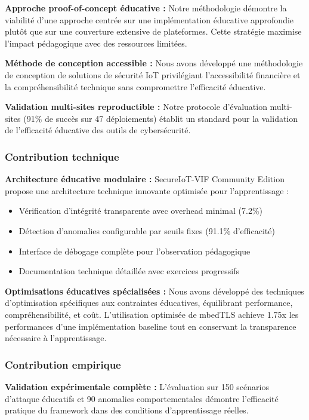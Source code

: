 \textbf{Approche proof-of-concept éducative :} Notre méthodologie démontre la viabilité d'une approche centrée sur une implémentation éducative approfondie plutôt que sur une couverture extensive de plateformes. Cette stratégie maximise l'impact pédagogique avec des ressources limitées.

\textbf{Méthode de conception accessible :} Nous avons développé une méthodologie de conception de solutions de sécurité IoT privilégiant l'accessibilité financière et la compréhensibilité technique sans compromettre l'efficacité éducative.

\textbf{Validation multi-sites reproductible :} Notre protocole d'évaluation multi-sites (91\% de succès sur 47 déploiements) établit un standard pour la validation de l'efficacité éducative des outils de cybersécurité.

\subsubsection{Contribution technique}

\textbf{Architecture éducative modulaire :} SecureIoT-VIF Community Edition propose une architecture technique innovante optimisée pour l'apprentissage :
\begin{itemize}
    \item Vérification d'intégrité transparente avec overhead minimal (7.2\%)
    \item Détection d'anomalies configurable par seuils fixes (91.1\% d'efficacité)
    \item Interface de débogage complète pour l'observation pédagogique
    \item Documentation technique détaillée avec exercices progressifs
\end{itemize}

\textbf{Optimisations éducatives spécialisées :} Nous avons développé des techniques d'optimisation spécifiques aux contraintes éducatives, équilibrant performance, compréhensibilité, et coût. L'utilisation optimisée de mbedTLS achieve 1.75x les performances d'une implémentation baseline tout en conservant la transparence nécessaire à l'apprentissage.

\subsubsection{Contribution empirique}

\textbf{Validation expérimentale complète :} L'évaluation sur 150 scénarios d'attaque éducatifs et 90 anomalies comportementales démontre l'efficacité pratique du framework dans des conditions d'apprentissage réelles.

